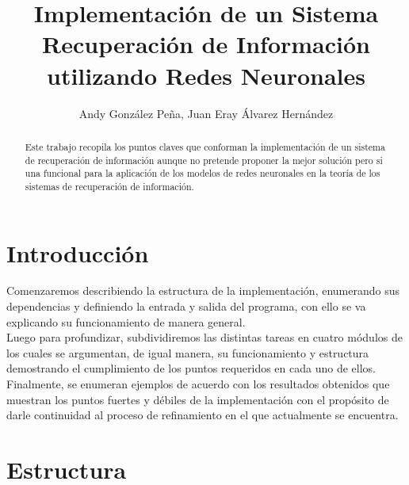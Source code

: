 \documentclass{llncs}
\begin{document}
\title{Implementaci\'on de un Sistema Recuperaci\'on de Informaci\'on utilizando Redes Neuronales}

\author{Andy Gonz\'alez Pe\~na, Juan Eray \'Alvarez Hern\'andez}

\maketitle


\begin{abstract}

Este trabajo recopila los puntos claves que conforman la implementaci\'on de un sistema de recuperaci\'on
de informaci\'on aunque no pretende proponer la mejor soluci\'on pero si una funcional para la aplicaci\'on
de los modelos de redes neuronales en la teor\'ia de los sistemas de recuperaci\'on de informaci\'on.

\end{abstract}

\section{Introducci\'on}\label{sec:Introduction}

Comenzaremos describiendo la estructura de la implementaci\'on, enumerando sus dependencias y definiendo la entrada y salida
del programa, con ello se va explicando su funcionamiento de manera general. \\
Luego para profundizar, subdividiremos las distintas tareas en cuatro  m\'odulos de los cuales se argumentan, de igual manera, su
funcionamiento y estructura demostrando el cumplimiento de los puntos requeridos en cada uno de ellos.\\
Finalmente, se enumeran ejemplos de acuerdo con los resultados obtenidos que muestran los puntos fuertes y d\'ebiles de la
implementaci\'on con el prop\'osito de darle continuidad al proceso de refinamiento en el que actualmente se encuentra.\\

\section{Estructura}\label{sec:Structure}
\end{document}
